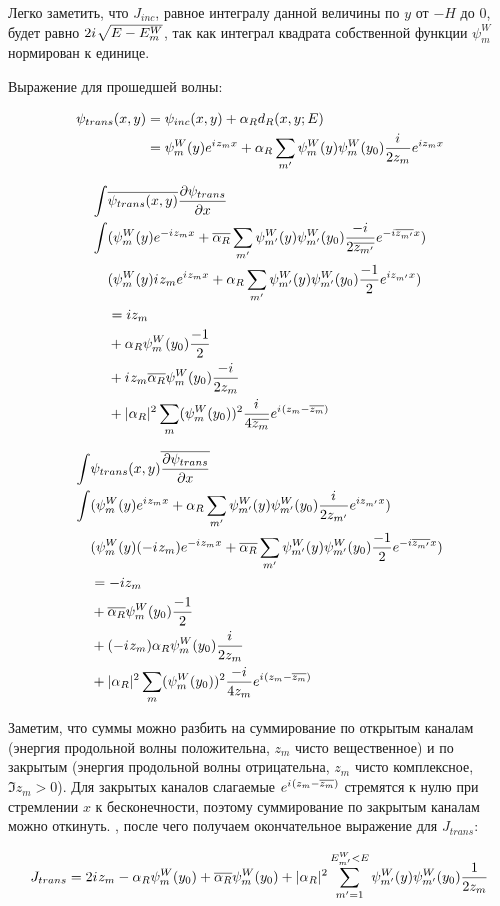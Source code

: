 Легко заметить, что $J_{inc}$, равное интегралу данной величины по $y$ от $-H$ до $0$, будет равно $2 {i\mkern1mu} \sqrt{E - E_m^W}$, так как интеграл квадрата собственной функции $\psi_m^W$ нормирован к единице.

Выражение для прошедшей волны:

\begin{align*}
\psi_{trans}(x, y)
&= \psi_{inc}(x, y) + \alpha_R d_R(x, y; E) \\
&= \psi_m^W(y) e^{{i\mkern1mu} z_m x} + \alpha_R \sum_{m'} \psi_m^W(y) \psi_m^W(y_0) \frac{{i\mkern1mu}}{2 z_m} e^{i z_m x}
\end{align*}

\begin{align*}
\int & \overline{\psi_{trans}(x, y)} \pdv{\psi_{trans}}{x} (x, y) \\
\int
& (\psi_m^W(y) e^{-{i\mkern1mu} z_m x} + \overline{\alpha_R} \sum_{m'} \psi_{m'}^W(y) \psi_{m'}^W(y_0) \frac{-{i\mkern1mu}}{2 \overline{z_{m'}}} e^{-i \overline{z_{m'}} x}) \\
& (\psi_m^W(y) {i\mkern1mu} z_m e^{{i\mkern1mu} z_m x} + \alpha_R \sum_{m'} \psi_{m'}^W(y) \psi_{m'}^W(y_0) \frac{-1}{2} e^{i z_{m'} x}) \\
&= i z_m \\
&+ \alpha_R \psi_{m}^W(y_0) \frac{-1}{2} \\
&+ {i\mkern1mu} z_m \overline{\alpha_R} \psi_{m}^W(y_0) \frac{-{i\mkern1mu}}{2 z_{m}} \\
&+ |\alpha_R|^2 \sum_m (\psi_{m}^W(y_0))^2 \frac{{i\mkern1mu}}{4 \overline{z_m}} e^{{i\mkern1mu} (z_m - \overline{z_m})}
\end{align*}

\begin{align*}
\int & \psi_{trans}(x, y) \overline{\pdv{\psi_{trans}}{x} (x, y)} \\
\int
& (\psi_m^W(y) e^{{i\mkern1mu} z_m x} + \alpha_R \sum_{m'} \psi_{m'}^W(y) \psi_{m'}^W(y_0) \frac{{i\mkern1mu}}{2 z_{m'}} e^{i z_{m'} x}) \\
& (\psi_m^W(y) (-{i\mkern1mu} z_m) e^{-{i\mkern1mu} z_m x} + \overline{\alpha_R} \sum_{m'} \psi_{m'}^W(y) \psi_{m'}^W(y_0) \frac{-1}{2} e^{-i \overline{z_{m'}} x}) \\
&= -i z_m \\
&+ \overline{\alpha_R} \psi_{m}^W(y_0) \frac{-1}{2} \\
&+ (-{i\mkern1mu} z_m) \alpha_R \psi_{m}^W(y_0) \frac{{i\mkern1mu}}{2 z_{m}} \\
&+ |\alpha_R|^2 \sum_m (\psi_{m}^W(y_0))^2 \frac{-{i\mkern1mu}}{4 z_m} e^{{i\mkern1mu} (z_m - \overline{z_m})}
\end{align*}

Заметим, что суммы можно разбить на суммирование по открытым каналам (энергия продольной волны положительна, $z_m$ чисто вещественное) и по закрытым (энергия продольной волны отрицательна, $z_m$ чисто комплексное, $\Im z_m > 0$). Для закрытых каналов слагаемые $e^{{i\mkern1mu} (z_m - \overline{z_m})}$ стремятся к нулю при стремлении $x$ к бесконечности, поэтому суммирование по закрытым каналам можно откинуть. , после чего получаем окончательное выражение для $J_{trans}$:

\begin{align*}
J_{trans} = 2 {i\mkern1mu} z_m - \alpha_R \psi_m^W(y_0) + \overline{\alpha_R} \psi_m^W(y_0) + |\alpha_R|^2 \sum_{m'= 1}^{E^W_{m'} < E} \psi_{m'}^W(y) \psi_{m'}^W(y_0) \frac{1}{2 z_m}
\end{align*}